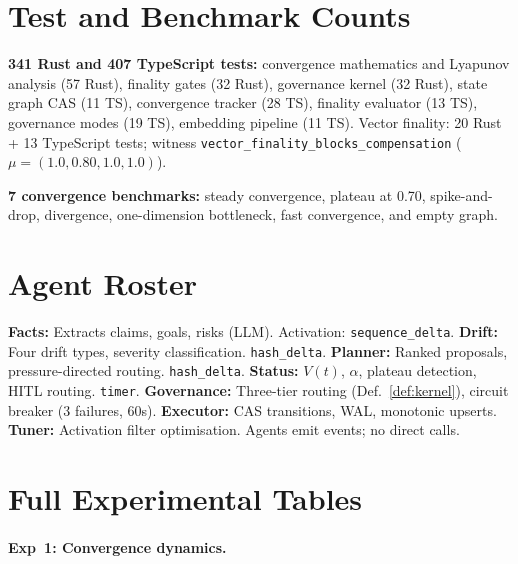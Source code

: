 \documentclass[11pt]{article}
\begin{document}
\section{Test and Benchmark Counts}
\label{sec:app-tests}

\textbf{341 Rust and 407 TypeScript tests:} convergence mathematics and Lyapunov analysis (57 Rust), finality gates (32 Rust), governance kernel (32 Rust), state graph CAS (11 TS), convergence tracker (28 TS), finality evaluator (13 TS), governance modes (19 TS), embedding pipeline (11 TS).
Vector finality: 20 Rust + 13 TypeScript tests; witness \texttt{vector\_finality\_blocks\_compensation} ($\mu = (1.0, 0.80, 1.0, 1.0)$).

\textbf{7 convergence benchmarks:} steady convergence, plateau at 0.70, spike-and-drop, divergence, one-dimension bottleneck, fast convergence, and empty graph.

\section{Agent Roster}
\label{sec:app-agents}

\textbf{Facts:} Extracts claims, goals, risks (LLM). Activation: \texttt{sequence\_delta}.
\textbf{Drift:} Four drift types, severity classification. \texttt{hash\_delta}.
\textbf{Planner:} Ranked proposals, pressure-directed routing. \texttt{hash\_delta}.
\textbf{Status:} $V(t)$, $\alpha$, plateau detection, HITL routing. \texttt{timer}.
\textbf{Governance:} Three-tier routing (Def.~\ref{def:kernel}), circuit breaker (3 failures, 60s).
\textbf{Executor:} CAS transitions, WAL, monotonic upserts.
\textbf{Tuner:} Activation filter optimisation.
Agents emit events; no direct calls.

\section{Full Experimental Tables}
\label{sec:app-results}

\paragraph{Exp~1: Convergence dynamics.}
\end{document}

